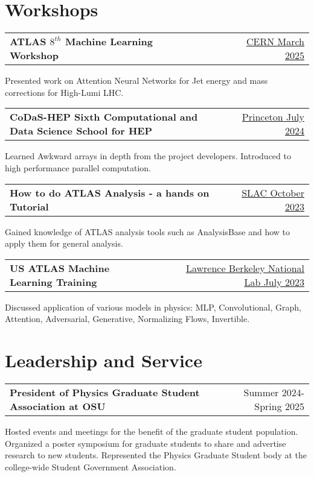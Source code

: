 \documentclass[a4paper,12pt]{article}
\makeatletter
\newenvironment{jobshort}[2]
    {
    \begin{tabularx}{\linewidth}{@{}l X r@{}}
    \textbf{#1} & \hfill &  #2 \\[3.75pt]
    \end{tabularx}
    }
    {
    }
\makeatother
\begin{document}
\section{Workshops}
\begin{jobshort}{ATLAS $8^{th}$ Machine Learning Workshop}{\href{https://indico.cern.ch/event/1488957/}{CERN March 2025}}
Presented work on Attention Neural Networks for Jet energy and mass corrections for High-Lumi LHC.
\end{jobshort}

\begin{jobshort}{CoDaS-HEP Sixth Computational and Data Science School for HEP}{\href{https://indico.cern.ch/event/1422680/}{Princeton July 2024}}
Learned Awkward arrays in depth from the project developers. Introduced to high performance parallel computation.
\end{jobshort}

\begin{jobshort}{How to do ATLAS Analysis - a hands on Tutorial}{\href{https://indico.cern.ch/event/1309794/}{SLAC October 2023}}
Gained knowledge of ATLAS analysis tools such as AnalysisBase and how to apply them for general analysis.
\end{jobshort}

\begin{jobshort}{US ATLAS Machine Learning Training}{\href{https://indico.cern.ch/event/1264566/}{Lawrence Berkeley National Lab July 2023}}
Discussed application of various models in physics: MLP, Convolutional, Graph, Attention, Adversarial, Generative, Normalizing Flows, Invertible.
\end{jobshort}

\section{Leadership and Service}
\begin{jobshort}{President of Physics Graduate Student Association at OSU}{Summer 2024-Spring 2025}
Hosted events and meetings for the benefit of the graduate student population. Organized a poster symposium for graduate students to share and advertise research to new students. Represented the Physics Graduate Student body at the college-wide Student Government Association.
\end{jobshort}
\end{document}
